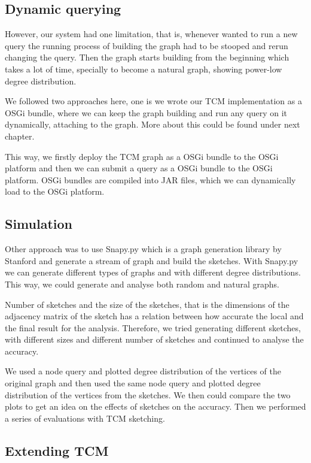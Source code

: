 \documentclass[conference]{IEEEtran}
\begin{document}
\subsection{Dynamic querying}

However, our system had one limitation, that is, whenever wanted to run a new query the running process of building the graph had to be stooped and rerun changing the query. Then the graph starts building from the beginning which takes a lot of time, specially to become a  natural graph, showing power-low degree distribution. 


We followed two approaches here, one is we wrote our TCM implementation as a OSGi bundle, where we can keep the graph building and run any query on it dynamically, attaching to the graph. More about this could be found under next chapter. 


This way, we firstly deploy the TCM graph as a OSGi bundle to the OSGi platform and then we can submit a query as a OSGi bundle to the OSGi platform. OSGi bundles are compiled into JAR files, which we can dynamically load to the OSGi platform. 

\subsection{Simulation}

Other approach was to use Snapy.py which is a graph generation library by Stanford and generate a stream of graph and build the sketches.  With Snapy.py we can generate different types of graphs and with different degree distributions. This way, we could generate and analyse both random and natural graphs.

Number of sketches and the size of the sketches, that is the dimensions of the adjacency matrix of the sketch has a relation between how accurate the local and the final result for the analysis. Therefore, we tried generating different sketches, with different sizes and different number of sketches and continued to analyse the accuracy. 


We used a node query and plotted degree distribution of the vertices of the original graph and then used the same node query and plotted degree distribution of the vertices from the sketches. We then could compare the two plots to get an idea on the effects of sketches on the accuracy.  Then we performed a series of evaluations with TCM sketching. 

\subsection{Extending TCM}
\end{document}
